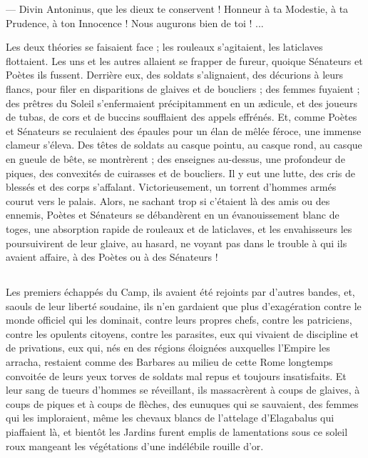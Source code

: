 \documentclass[a4paper, 11pt, oneside, polutonikogreek, french]{article}
\begin{document}
--- Divin Antoninus, que les dieux te conservent ! Honneur à ta Modestie, à ta Prudence, à ton Innocence ! Nous augurons bien de toi ! ...

Les deux théories se faisaient face ; les rouleaux s'agitaient, les laticlaves flottaient. Les uns et les autres allaient se frapper de fureur, quoique Sénateurs et Poètes ils fussent. Derrière eux, des soldats s'alignaient, des décurions à leurs flancs, pour filer en disparitions de glaives et de boucliers ; des femmes fuyaient ; des prêtres du Soleil s'enfermaient précipitamment en un ædicule, et des joueurs de tubas, de cors et de buccins soufflaient des appels effrénés. Et, comme Poètes et Sénateurs se reculaient des épaules pour un élan de mêlée féroce, une immense clameur s'éleva. Des têtes de soldats au casque pointu, au casque rond, au casque en gueule de bête, se montrèrent ; des enseignes au-dessus, une profondeur de piques, des convexités de cuirasses et de boucliers. Il y eut une lutte, des cris de blessés et des corps s'affalant. Victorieusement, un torrent d'hommes armés courut vers le palais. Alors, ne sachant trop si c'étaient là des amis ou des ennemis, Poètes et Sénateurs se débandèrent en un évanouissement blanc de toges, une absorption rapide de rouleaux et de laticlaves, et les envahisseurs les poursuivirent de leur glaive, au hasard, ne voyant pas dans le trouble à qui ils avaient affaire, à des Poètes ou à des Sénateurs !
\clearpage
\subsection{}
\paragraph{}
Les premiers échappés du Camp, ils avaient été rejoints par d'autres bandes, et, saouls de leur liberté soudaine, ils n'en gardaient que plus d'exagération contre le monde officiel qui les dominait, contre leurs propres chefs, contre les patriciens, contre les opulents citoyens, contre les parasites, eux qui vivaient de discipline et de privations, eux qui, nés en des régions éloignées auxquelles l'Empire les arracha, restaient comme des Barbares au milieu de cette Rome longtemps convoitée de leurs yeux torves de soldats mal repus et toujours insatisfaits. Et leur sang de tueurs d'hommes se réveillant, ils massacrèrent à coups de glaives, à coups de piques et à coups de flèches, des eunuques qui se sauvaient, des femmes qui les imploraient, même les chevaux blancs de l'attelage d'Elagabalus qui piaffaient là, et bientôt les Jardins furent emplis de lamentations sous ce soleil roux mangeant les végétations d'une indélébile rouille d'or.
\end{document}
